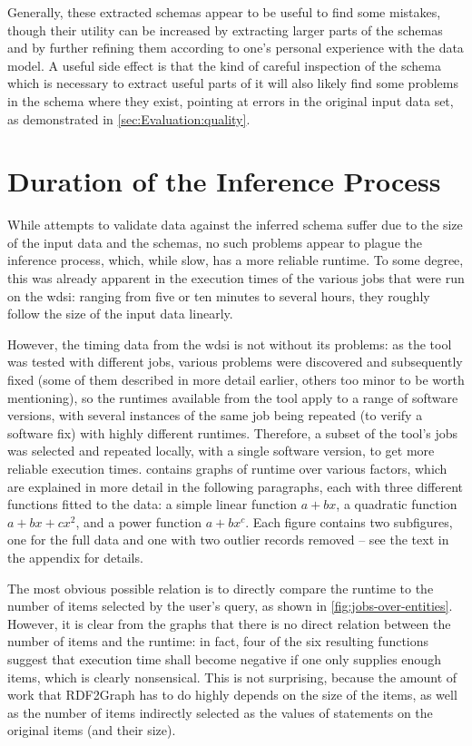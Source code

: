 Generally, these extracted \glspl{schema} appear to be useful to find some mistakes,
though their utility can be increased by extracting larger parts of the \glspl{schema}
and by further refining them according to one’s personal experience with the data model.
A useful side effect is that the kind of careful inspection of the \gls{schema}
which is necessary to extract useful parts of it
will also likely find some problems in the \gls{schema} where they exist,
pointing at errors in the original input data set,
as demonstrated in \cref{sec:Evaluation:quality}.

\section{Duration of the Inference Process}
\label{sec:Evaluation:duration}

While attempts to validate data against the inferred \gls{schema}
suffer due to the size of the input data and the \glspl{schema},
no such problems appear to plague the inference process,
which, while slow, has a more reliable runtime.
To some degree, this was already apparent in the execution times
of the various \glspl{job} that were run on the \gls{wdsi}:
ranging from five or ten minutes to several hours,
they roughly follow the size of the input data linearly.

However, the timing data from the \gls{wdsi}
is not without its problems:
as the tool was tested with different \glspl{job},
various problems were discovered and subsequently fixed
(some of them described in more detail earlier, others too minor to be worth mentioning),
so the runtimes available from the tool apply to a range of software versions,
with several instances of the same \gls{job} being repeated (to verify a software fix)
with highly different runtimes.
Therefore, a subset of the tool’s \glspl{job} was selected
and repeated locally, with a single software version,
to get more reliable execution times.
 contains graphs of runtime over various factors,
which are explained in more detail in the following paragraphs,
each with three different functions fitted to the data:
a simple linear function $a+bx$,
a quadratic function $a+bx+cx^2$,
and a power function $a+bx^c$.
Each figure contains two subfigures,
one for the full data and one with two outlier records removed –
see the text in the appendix for details.

The most obvious possible relation is
to directly compare the runtime to the number of \glspl{item} selected by the user’s query,
as shown in \cref{fig:jobs-over-entities}.
However, it is clear from the graphs that there is no direct relation
between the number of \glspl{item} and the runtime:
in fact, four of the six resulting functions suggest that
execution time shall become negative if one only supplies enough \glspl{item},
which is clearly nonsensical.
This is not surprising,
because the amount of work that \gls{RDF2Graph} has to do
highly depends on the size of the \glspl{item},
as well as the number of \glspl{item} indirectly selected as the values of \glspl{statement} on the original \glspl{item} (and their size).


